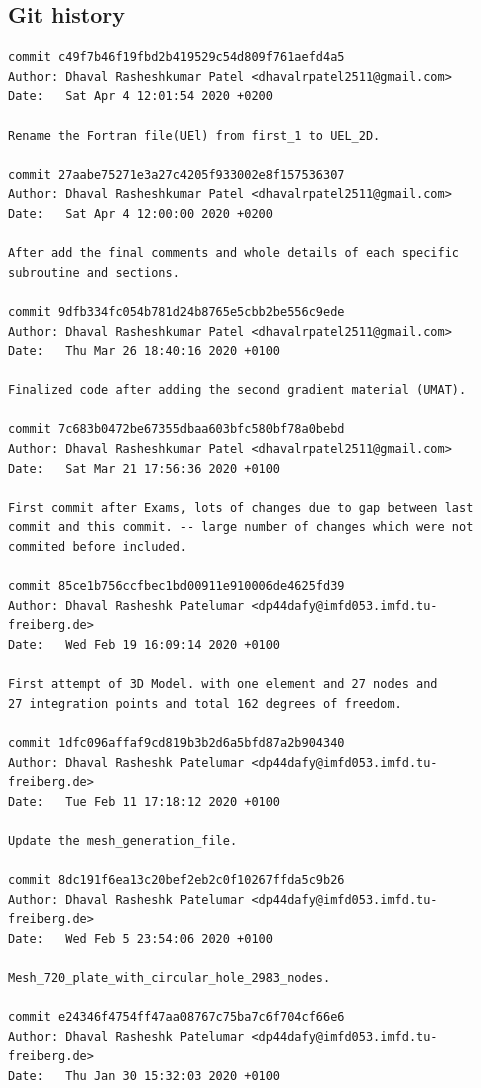 \documentclass[12pt]{article}
\begin{document}
\begin{appendices}
\newpage
\section{Git history}
\begin{verbatim}
commit c49f7b46f19fbd2b419529c54d809f761aefd4a5
Author: Dhaval Rasheshkumar Patel <dhavalrpatel2511@gmail.com>
Date:   Sat Apr 4 12:01:54 2020 +0200

Rename the Fortran file(UEl) from first_1 to UEL_2D.

commit 27aabe75271e3a27c4205f933002e8f157536307
Author: Dhaval Rasheshkumar Patel <dhavalrpatel2511@gmail.com>
Date:   Sat Apr 4 12:00:00 2020 +0200

After add the final comments and whole details of each specific 
subroutine and sections.

commit 9dfb334fc054b781d24b8765e5cbb2be556c9ede
Author: Dhaval Rasheshkumar Patel <dhavalrpatel2511@gmail.com>
Date:   Thu Mar 26 18:40:16 2020 +0100

Finalized code after adding the second gradient material (UMAT).

commit 7c683b0472be67355dbaa603bfc580bf78a0bebd
Author: Dhaval Rasheshkumar Patel <dhavalrpatel2511@gmail.com>
Date:   Sat Mar 21 17:56:36 2020 +0100

First commit after Exams, lots of changes due to gap between last 
commit and this commit. -- large number of changes which were not 
commited before included.

commit 85ce1b756ccfbec1bd00911e910006de4625fd39
Author: Dhaval Rasheshk Patelumar <dp44dafy@imfd053.imfd.tu-freiberg.de>
Date:   Wed Feb 19 16:09:14 2020 +0100

First attempt of 3D Model. with one element and 27 nodes and 
27 integration points and total 162 degrees of freedom.

commit 1dfc096affaf9cd819b3b2d6a5bfd87a2b904340
Author: Dhaval Rasheshk Patelumar <dp44dafy@imfd053.imfd.tu-freiberg.de>
Date:   Tue Feb 11 17:18:12 2020 +0100

Update the mesh_generation_file.

commit 8dc191f6ea13c20bef2eb2c0f10267ffda5c9b26
Author: Dhaval Rasheshk Patelumar <dp44dafy@imfd053.imfd.tu-freiberg.de>
Date:   Wed Feb 5 23:54:06 2020 +0100

Mesh_720_plate_with_circular_hole_2983_nodes.

commit e24346f4754ff47aa08767c75ba7c6f704cf66e6
Author: Dhaval Rasheshk Patelumar <dp44dafy@imfd053.imfd.tu-freiberg.de>
Date:   Thu Jan 30 15:32:03 2020 +0100


\end{verbatim}
\end{appendices}
\end{document}
